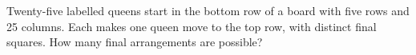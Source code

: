 Twenty-five labelled queens start in the bottom row of a board with five rows and 25 columns. Each makes one queen move to the top row, with distinct final squares. How many final arrangements are possible?
